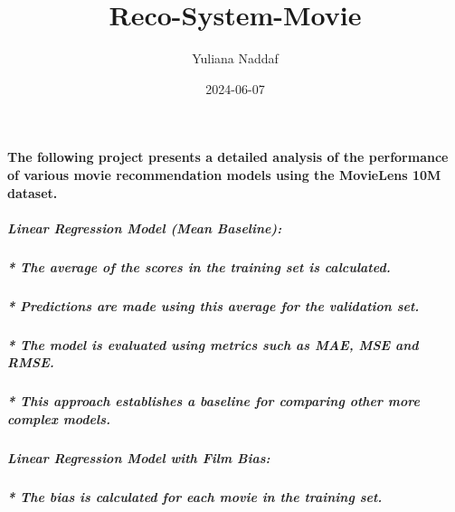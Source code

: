 \documentclass[
]{article}
\title{Reco-System-Movie}
\author{Yuliana Naddaf}
\date{2024-06-07}
\begin{document}
\maketitle

\hypertarget{the-following-project-presents-a-detailed-analysis-of-the-performance-of-various-movie-recommendation-models-using-the-movielens-10m-dataset.}{%
\paragraph{The following project presents a detailed analysis of the
performance of various movie recommendation models using the MovieLens
10M
dataset.}\label{the-following-project-presents-a-detailed-analysis-of-the-performance-of-various-movie-recommendation-models-using-the-movielens-10m-dataset.}}

\hypertarget{linear-regression-model-mean-baseline}{%
\subparagraph{\texorpdfstring{\textbf{Linear Regression Model (Mean
Baseline):}}{Linear Regression Model (Mean Baseline):}}\label{linear-regression-model-mean-baseline}}

\hypertarget{the-average-of-the-scores-in-the-training-set-is-calculated.}{%
\subparagraph{* The average of the scores in the training set is
calculated.}\label{the-average-of-the-scores-in-the-training-set-is-calculated.}}

\hypertarget{predictions-are-made-using-this-average-for-the-validation-set.}{%
\subparagraph{* Predictions are made using this average for the
validation
set.}\label{predictions-are-made-using-this-average-for-the-validation-set.}}

\hypertarget{the-model-is-evaluated-using-metrics-such-as-mae-mse-and-rmse.}{%
\subparagraph{* The model is evaluated using metrics such as MAE, MSE
and
RMSE.}\label{the-model-is-evaluated-using-metrics-such-as-mae-mse-and-rmse.}}

\hypertarget{this-approach-establishes-a-baseline-for-comparing-other-more-complex-models.}{%
\subparagraph{* This approach establishes a baseline for comparing other
more complex
models.}\label{this-approach-establishes-a-baseline-for-comparing-other-more-complex-models.}}

\hypertarget{linear-regression-model-with-film-bias}{%
\subparagraph{\texorpdfstring{\textbf{Linear Regression Model with Film
Bias:}}{Linear Regression Model with Film Bias:}}\label{linear-regression-model-with-film-bias}}

\hypertarget{the-bias-is-calculated-for-each-movie-in-the-training-set.}{%
\subparagraph{* The bias is calculated for each movie in the training
set.}\label{the-bias-is-calculated-for-each-movie-in-the-training-set.}}
\end{document}
